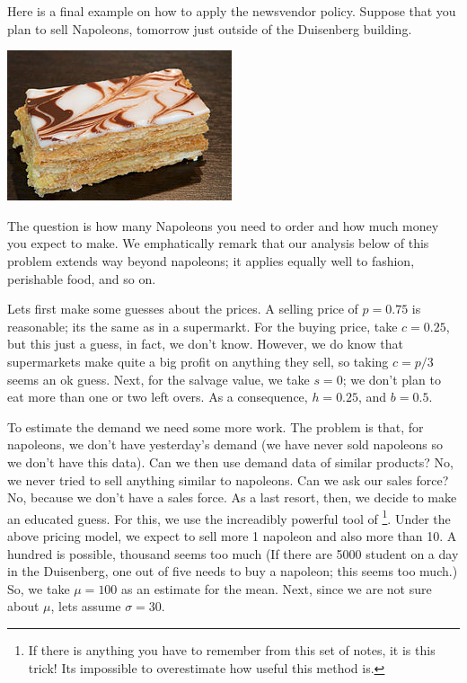 \begin{example}
Here is a final example on how to apply the newsvendor policy.  Suppose that you plan to sell Napoleons, tomorrow  just outside of the Duisenberg building.
  \begin{center}
   \includegraphics[scale = 1.0]{figures/mille-feuille}
  \end{center}
The question is how  many  Napoleons  you need to order and how much money  you expect to make. We emphatically remark that our analysis below  of this problem extends way beyond napoleons; it applies equally well to fashion, perishable food, and so on.
  

Lets first make some guesses about the prices. A selling price of $p=0.75$ is reasonable; its the same as in a supermarkt. For the buying price, take $c = 0.25$, but this just a guess, in fact, we don't know. However, we do know that supermarkets make quite a big profit on anything they sell, so taking $c=p/3$ seems an ok guess. Next, for the salvage value, we take $s=0$; we don't plan to eat more than one or two left overs. As a consequence, $h = 0.25$, and $b = 0.5$. 

To estimate  the demand we need some more work. The problem is that, for napoleons, we don't have yesterday's demand (we have never sold napoleons so we don't have this data). Can we then use demand data of similar products?  No, we  never tried to sell anything similar to napoleons. Can we ask our sales force?  No, because  we don't have a sales force.  As a last resort, then, we decide to make an educated guess. For this, we use the increadibly powerful tool of \footnote{If there is anything you have to remember from this set of notes, it is this trick! Its impossible to overestimate how useful this method is.}. Under the above pricing model, we expect to sell more 1 napoleon and also more than 10. A hundred  is possible, thousand seems too much (If there are 5000 student on a day in the Duisenberg, one out of five needs to buy a napoleon; this seems too much.) So, we take  $\mu=100$ as an estimate for the mean. Next, since we are not sure about $\mu$, lets assume $\sigma=30$. 


\end{example}
